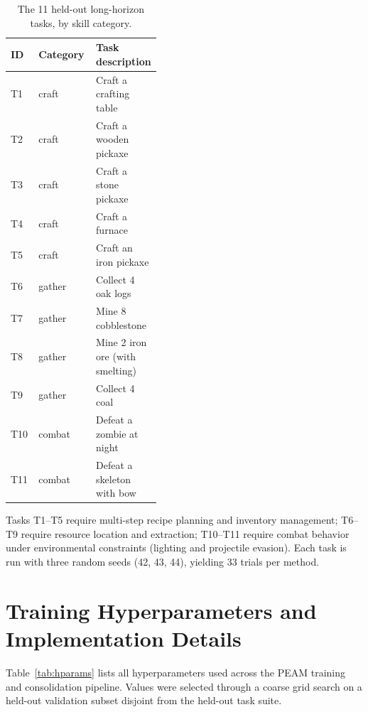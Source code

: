 \documentclass[11pt]{article}
\begin{document}
\begin{table}[h]
\centering
\small
\setlength{\tabcolsep}{4pt}
\caption{The 11 held-out long-horizon tasks, by skill category.}
\label{tab:tasks}
\begin{tabular}{llp{0.42\linewidth}}
\toprule
ID & Category & Task description \\
\midrule
T1  & craft  & Craft a crafting table \\           %
T2  & craft  & Craft a wooden pickaxe \\           %
T3  & craft  & Craft a stone pickaxe \\            %
T4  & craft  & Craft a furnace \\                  %
T5  & craft  & Craft an iron pickaxe \\            %
T6  & gather & Collect 4 oak logs \\               %
T7  & gather & Mine 8 cobblestone \\               %
T8  & gather & Mine 2 iron ore (with smelting) \\  %
T9  & gather & Collect 4 coal \\                   %
T10 & combat & Defeat a zombie at night \\         %
T11 & combat & Defeat a skeleton with bow \\       %
\bottomrule
\end{tabular}
\end{table}

Tasks T1--T5 require multi-step recipe planning and inventory
management; T6--T9 require resource location and extraction;
T10--T11 require combat behavior under environmental
constraints (lighting and projectile evasion). Each task is
run with three random seeds (42, 43, 44), yielding 33 trials
per method.

\section{Training Hyperparameters and Implementation Details}
\label{app:hparams}

Table~\ref{tab:hparams} lists all hyperparameters used across
the PEAM training and consolidation pipeline. Values were
selected through a coarse grid search on a held-out validation
subset disjoint from the held-out task suite.
\end{document}
